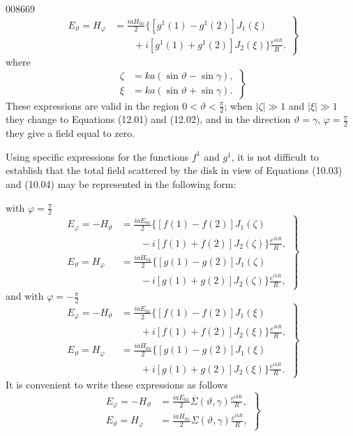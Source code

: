 \begin{scanpage}{0086}{69}
\[
\left.\begin{aligned}
E_\vartheta=H_\varphi&=\frac{iaH_{0x}}2\{[g^1(1)-g^1(2)]J_1(\xi)\\
&\qquad+i[g^1(1)+g^1(2)]J_2(\xi)\}\frac{e^{ikR}}R.
\end{aligned}\right\}\tag{12.06}
\]
where
\[\left.\begin{aligned}\zeta&=ka(\sin\vartheta-\sin\gamma),\\\xi&=ka(\sin\vartheta+\sin\gamma).\end{aligned}\right\}\tag{12.07}\]
These expressions are valid in the region $0<\vartheta<\frac\pi2$; when $|\zeta|\gg1$ and $|\xi|\gg1$ they change to Equations (12.01) and (12.02), and in the direction $\vartheta=\gamma$, $\varphi=\frac\pi2$ they give a field equal to zero.

Using specific expressions for the functions $f^1$ and $g^1$, it is not difficult to establish that the total field scattered by the disk in view of Equations (10.03) and (10.04) may be represented in the following form:

with $\varphi=\frac\pi2$
\[
\left.\begin{aligned}
E_\varphi=-H_\vartheta&=\frac{iaE_{0x}}2\{[f(1)-f(2)]J_1(\zeta)\\
&\qquad-i[f(1)+f(2)]J_2(\zeta)\}\frac{e^{ikR}}R,\\
E_\vartheta=H_\varphi&=\frac{iaH_{0x}}2\{[g(1)-g(2)]J_1(\zeta)\\
&\qquad-i[g(1)+g(2)]J_2(\zeta)\}\frac{e^{ikR}}R,
\end{aligned}\right\}\tag{12.08}
\]
and with $\varphi=-\frac\pi2$
\[
\left.\begin{aligned}
E_\varphi=-H_\vartheta&=\frac{iaE_{0x}}2\{[f(1)-f(2)]J_1(\xi)\\
&\qquad+i[f(1)+f(2)]J_2(\xi)\}\frac{e^{ikR}}R,\\
E_\vartheta=H_\varphi&=\frac{iaH_{0x}}2\{[g(1)-g(2)]J_1(\xi)\\
&\qquad+i[g(1)+g(2)]J_2(\xi)\}\frac{e^{ikR}}R.
\end{aligned}\right\}\tag{12.09}
\]
It is convenient to write these expressions as follows
\[
\left.\begin{aligned}
E_\varphi=-H_\vartheta&=\frac{iaE_{0x}}2\overline\Sigma(\vartheta,\gamma)\frac{e^{ikR}}R,\\
E_\vartheta=H_\varphi&=\frac{iaH_{0x}}2\Sigma(\vartheta,\gamma)\frac{e^{ikR}}R,
\end{aligned}\right\}\tag{12.10}
\]
\end{scanpage}
